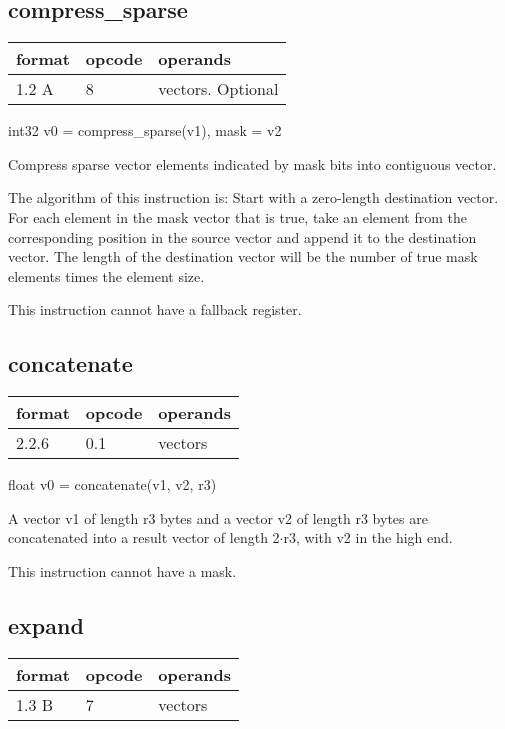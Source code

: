 \documentclass[forwardcom.tex]{subfiles}
\begin{document}
\subsection{compress\_sparse}
\label{table:compressSparseInstruction}
\begin{tabular}{|p{12mm}|p{15mm}|p{100mm}|}
\hline
\bfseries format & \bfseries opcode & \bfseries operands \\ \hline
1.2 A & 8 & vectors. Optional \\ \hline
\end{tabular}
\vv

int32 v0 = compress\_sparse(v1), mask = v2
\vv

Compress sparse vector elements indicated by mask bits into contiguous vector. 
\vv

The algorithm of this instruction is:
Start with a zero-length destination vector.
For each element in the mask vector that is true, take an element from the corresponding position in the source vector and append it to the destination vector.
The length of the destination vector will be the number of true mask elements
times the element size.
\vv

This instruction cannot have a fallback register.
\vv


\subsection{concatenate}
\label{table:concatenateInstruction}
\begin{tabular}{|p{12mm}|p{15mm}|p{100mm}|}
\hline
\bfseries format & \bfseries opcode & \bfseries operands \\ \hline
2.2.6 & 0.1 & vectors \\ \hline
\end{tabular}
\vv

float v0 = concatenate(v1, v2, r3)
\vv

A vector v1 of length r3 bytes and a vector v2 of
length r3 bytes are concatenated into a result vector
of length 2$\cdot$r3, with v2 in the high end.
\vv

This instruction cannot have a mask.
\vv

\subsection{expand}
\label{table:expandInstruction}
\begin{tabular}{|p{12mm}|p{15mm}|p{100mm}|}
\hline
\bfseries format & \bfseries opcode & \bfseries operands \\ \hline
1.3 B & 7 & vectors \\ \hline
\end{tabular}
\vv
\end{document}
